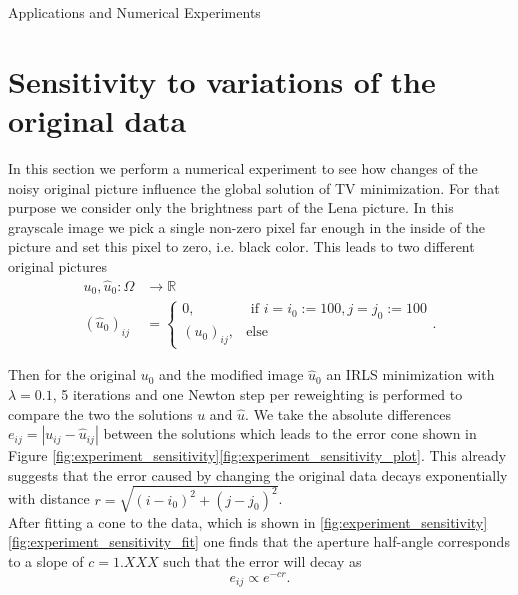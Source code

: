 \begin{chapter}{Applications and Numerical Experiments}
\section{Sensitivity to variations of the original data} %
\label{sec:Sensitivity}
In this section we perform a numerical experiment to see how changes of the noisy original picture influence the global solution of TV
minimization.
For that purpose we consider only the brightness part of the Lena picture. In this grayscale image we pick a single non-zero pixel far enough in the inside of
the picture and set this pixel to zero, i.e. black color. This leads to two different original pictures
\begin{align}
    u_0,\hat{u}_0:\Omega &\to\mathbb{R}\\
    (\hat{u}_0)_{ij}&=\begin{cases}
	0, & \text{ if } i=i_0:=100,j=j_0:=100\\
	(u_0)_{ij}, &\text{else}
    \end{cases}.
\end{align}

Then for the original $u_0$ and the modified image $\hat{u}_0$ an IRLS minimization with $\lambda=0.1$, 5 iterations and one Newton step per reweighting is
performed to compare the two the solutions $u$ and $\hat{u}$. We take the absolute differences $e_{ij}=|u_{ij}-\hat{u}_{ij}|$ between the solutions
which leads to the error cone shown in Figure \ref{fig:experiment_sensitivity}\ref{fig:experiment_sensitivity_plot}. This already suggests that the
error caused by changing the original data decays exponentially with distance $r=\sqrt{(i-i_0)^{2}+(j-j_0)^{2}}$.\\

After fitting a cone to the data, which is shown in \ref{fig:experiment_sensitivity}\ref{fig:experiment_sensitivity_fit}
one finds that the aperture half-angle corresponds to a slope of $c=1.XXX$ such that the error will decay as
\begin{equation}
    e_{ij}\propto e^{-cr}.
\end{equation}


\end{chapter}
